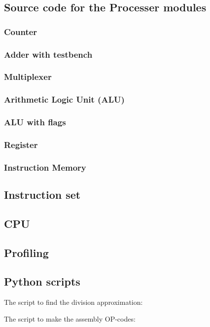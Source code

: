 \documentclass[12pt,a4paper]{article}
\begin{document}
\subsection{Source code for the Processer modules}
	\subsubsection{Counter}
			
	\subsubsection{Adder with testbench}
			
	\subsubsection{Multiplexer}
			
	\subsubsection{Arithmetic Logic Unit (ALU)}
		
	\subsubsection{ALU with flags}
			
	\subsubsection{Register}
			
	\subsubsection{Instruction Memory}
			
\subsection{Instruction set}
		
\subsection{CPU}
	
\subsection{Profiling}
	\label{toggle_full}	
	

\subsection{Python scripts}
	The script to find the division approximation:
	
	
	The script to make the assembly OP-codes:
		
\end{document}
